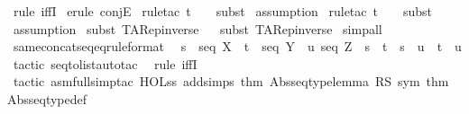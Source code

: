 \begin{isabellebody}
\ {\isacharparenleft}rule\ iffI{\isacharparenright}\isanewline
{}\isamarkupfalse%
\ {\isacharparenleft}erule\ conjE{\isacharparenright}\isanewline
{}\isamarkupfalse%
\ {\isacharparenleft}rule{\isacharunderscore}tac\ t\ {\isacharequal}\ {\isachardoublequoteopen}{\isacharbrackleft}{\isacharbrackright}{\isachardoublequoteclose}\ \ subst{\isacharparenright}\isanewline
{}\isamarkupfalse%
\isanewline
{}\isamarkupfalse%
\ assumption\isanewline
{}\isamarkupfalse%
\isanewline
{}\isamarkupfalse%
\ {\isacharparenleft}rule{\isacharunderscore}tac\ t\ {\isacharequal}\ {\isachardoublequoteopen}{\isacharbrackleft}{\isacharbrackright}{\isachardoublequoteclose}\ \ subst{\isacharparenright}\isanewline
{}\isamarkupfalse%
\ assumption\isanewline
{}\isamarkupfalse%
\ {\isacharparenleft}subst\ TARep{\isacharunderscore}inverse{\isacharparenright}\isanewline
{}\isamarkupfalse%
\ {}\isanewline
{}\isamarkupfalse%
\ {\isacharparenleft}subst\ TARep{\isacharunderscore}inverse{\isacharparenright}\isanewline
{}\isamarkupfalse%
\ simp{\isacharunderscore}all\isanewline
{}\isamarkupfalse%
%
\endisatagproof
{\isafoldproof}%
%
\isadelimproof
\isanewline
%
\endisadelimproof
\isanewline
\isanewline
{}\isamarkupfalse%
\ same{\isacharunderscore}concatseq{\isacharunderscore}eq{\isacharbrackleft}rule{\isacharunderscore}format{\isacharbrackright}\ {\isacharcolon}\isanewline
\ {\isachardoublequoteopen}s\ {\isacharcolon}\ seq\ X\ {\isacharminus}{\isacharminus}{\isachargreater}\ t\ {\isacharcolon}\ seq\ Y\ {\isacharminus}{\isacharminus}{\isachargreater}\ u{\isacharcolon}\ seq\ Z\ {\isacharminus}{\isacharminus}{\isachargreater}\ {\isacharparenleft}s\ {\isacharpercent}{\isacharampersand}{\isacharcircum}\ t\ {\isacharequal}\ s\ {\isacharpercent}{\isacharampersand}{\isacharcircum}\ u{\isacharparenright}\ {\isacharequal}\ {\isacharparenleft}t\ {\isacharequal}\ u{\isacharparenright}{\isachardoublequoteclose}\isanewline
%
\isadelimproof
%
\endisadelimproof
%
\isatagproof
{}\isamarkupfalse%
\ {\isacharparenleft}tactic\ {\isacharverbatimopen}seq{\isacharunderscore}to{\isacharunderscore}list{\isacharunderscore}auto{\isacharunderscore}tac\ {}{\isacharverbatimclose}{\isacharparenright}\isanewline
{}\isamarkupfalse%
\ {\isacharparenleft}rule\ iffI{\isacharparenright}\isanewline
{}\isamarkupfalse%
\ {\isacharparenleft}tactic\ {\isacharverbatimopen}asm{\isacharunderscore}full{\isacharunderscore}simp{\isacharunderscore}tac\ {\isacharparenleft}HOL{\isacharunderscore}ss\ addsimps\ {\isacharbrackleft}thm\ {\isachardoublequote}Abs{\isacharunderscore}seqtype{\isacharunderscore}lemma{\isachardoublequote}\ RS\ sym{\isacharcomma}\ thm\ {\isachardoublequote}Abs{\isacharunderscore}seqtype{\isacharunderscore}def{\isachardoublequote}{\isacharbrackright}{\isacharparenright}\ {}{\isacharverbatimclose}{\isacharparenright}\isanewline

\end{isabellebody}

